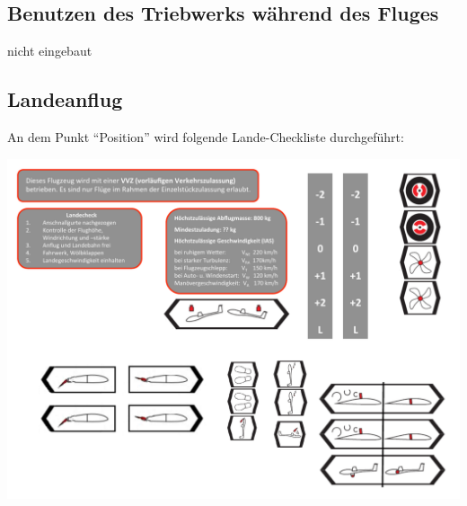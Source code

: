 \subsection{Benutzen des Triebwerks während des Fluges}
nicht eingebaut
\newpage
\subsection{Landeanflug}
An dem Punkt "`Position"' wird folgende Lande-Checkliste durchgeführt:
\newline
\begin{center}
\includegraphics[width=.45\textwidth]{bilder/landecheck.pdf}
\end{center}



